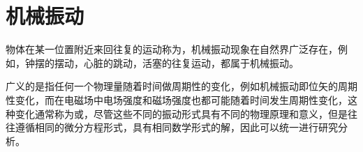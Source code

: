 \chapter{机械振动}
物体在某一位置附近来回往复的运动称为，机械振动现象在自然界广泛存在，例如，钟摆的摆动，心脏的跳动，活塞的往复运动，都属于机械振动。

广义的是指任何一个物理量随着时间做周期性的变化，例如机械振动即位矢的周期性变化，而在电磁场中电场强度和磁场强度也都可能随着时间发生周期性变化，这种变化通常称为或，尽管这些不同的振动形式具有不同的物理原理和意义，但是往往遵循相同的微分方程形式，具有相同数学形式的解，因此可以统一进行研究分析。




